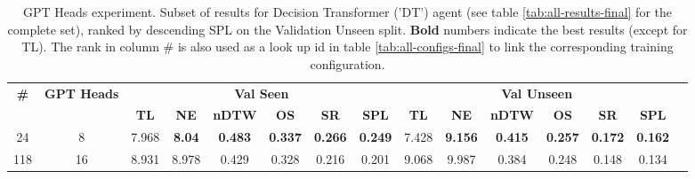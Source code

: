 \begin{table}
\centering
\caption{\label{tab:dt_heads}GPT Heads experiment. Subset of results for Decision Transformer ('DT') agent (see table \ref{tab:all-results-final} for the complete set), ranked by descending SPL on the Validation Unseen split. \textbf{Bold} numbers indicate the best results (except for TL). The rank in column \# is also used as a look up id in table \ref{tab:all-configs-final} to link the corresponding training configuration.}
\begin{tabular}{@{\hskip3pt}c@{\hskip3pt}c@{\hskip3pt}c@{\hskip3pt}c@{\hskip3pt}c@{\hskip3pt}c@{\hskip3pt}c@{\hskip3pt}c@{\hskip3pt}c@{\hskip3pt}c@{\hskip3pt}c@{\hskip3pt}c@{\hskip3pt}c@{\hskip3pt}c@{\hskip3pt}c}
\toprule
                                  \textbf{\#} & \textbf{GPT Heads} & \multicolumn{6}{c}{\textbf{Val Seen}} & \multicolumn{6}{c}{\textbf{Val Unseen}} \\
\cmidrule(l){3-8}\cmidrule(l){9-14}\textbf{~} &         \textbf{~} &       \textbf{TL} &    \textbf{NE} &   \textbf{nDTW} &     \textbf{OS} &     \textbf{SR} &    \textbf{SPL} &         \textbf{TL} &     \textbf{NE} &   \textbf{nDTW} &     \textbf{OS} &     \textbf{SR} &    \textbf{SPL} \\
\midrule
                                           24 &                  8 &             7.968 &  \textbf{8.04} &  \textbf{0.483} &  \textbf{0.337} &  \textbf{0.266} &  \textbf{0.249} &               7.428 &  \textbf{9.156} &  \textbf{0.415} &  \textbf{0.257} &  \textbf{0.172} &  \textbf{0.162} \\
                                          118 &                 16 &             8.931 &          8.978 &           0.429 &           0.328 &           0.216 &           0.201 &               9.068 &           9.987 &           0.384 &           0.248 &           0.148 &           0.134 \\
\bottomrule
\end{tabular}
\end{table}
